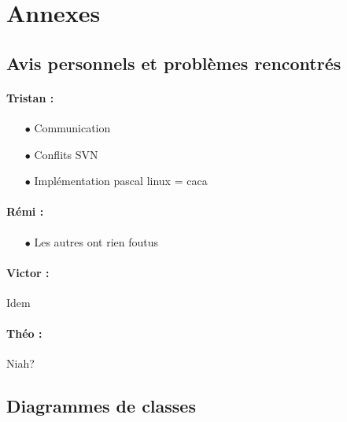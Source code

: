 \section{Annexes}
\subsection{Avis personnels et problèmes rencontrés}
\paragraph{Tristan :}
\begin{itemize}
\item[$\bullet$]Communication
\item[$\bullet$]Conflits SVN
\item[$\bullet$]Implémentation pascal linux = caca
\end{itemize}
\paragraph{Rémi :}
\begin{itemize}
\item[$\bullet$] Les autres ont rien foutus
\end{itemize}
\paragraph{Victor :}

Idem
\paragraph{Théo :}

Niah?
\newpage
\subsection{Diagrammes de classes}

